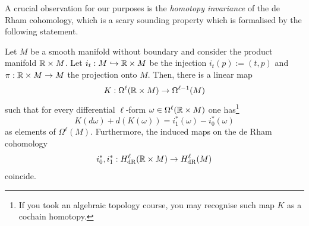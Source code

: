 A crucial observation for our purposes is the \emph{homotopy invariance} of the de Rham cohomology, which is a scary sounding property which is formalised by the following statement.

\begin{theorem}\label{thm:deRham-invariance}
	Let $M$ be a smooth manifold without boundary and consider the product  manifold $\mathbb{R}\times M$.
	Let $i_t : M \hookrightarrow \mathbb{R}\times M$ be the injection $i_t(p) := (t,p)$ and $\pi : \mathbb{R}\times M \to M$ the projection onto $M$.
	Then, there is a linear map
	\begin{equation}
		K : \Omega^\ell(\mathbb{R}\times M)\to \Omega^{\ell-1}(M)
	\end{equation}
	such that for every differential $\ell$-form $\omega\in\Omega^\ell(\mathbb{R}\times M)$ one has\footnote{If you took an algebraic topology course, you may recognise such map $K$ as a cochain homotopy.}
	\begin{equation}
		K(d\omega) + d(K(\omega)) = i^*_1(\omega) - i^*_0(\omega)
	\end{equation}
	as elements of $\Omega^\ell(M)$.
	Furthermore, the induced maps on the de Rham cohomology
	\begin{equation}
		i_0^*, i_1^* : H_{\mathrm{dR}}^\ell(\mathbb{R}\times M) \to H_{\mathrm{dR}}^\ell(M)
	\end{equation}
	coincide.
\end{theorem}
